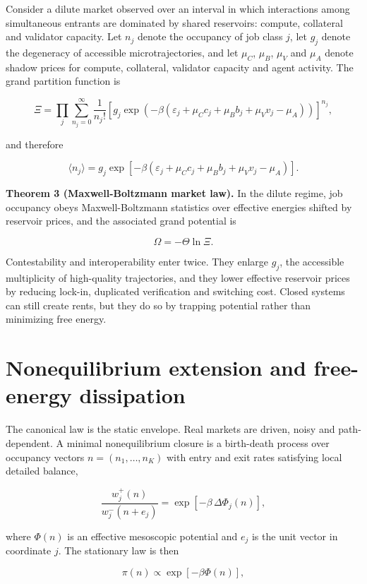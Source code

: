 Consider a dilute market observed over an interval in which interactions
among simultaneous entrants are dominated by shared reservoirs: compute,
collateral and validator capacity. Let \(n_j\) denote the occupancy of
job class \(j\), let \(g_j\) denote the degeneracy of accessible
microtrajectories, and let \(\mu_C\), \(\mu_B\), \(\mu_V\) and \(\mu_A\)
denote shadow prices for compute, collateral, validator capacity and
agent activity. The grand partition function is

\[
\Xi = \prod_j \sum_{n_j=0}^{\infty} \frac{1}{n_j!}
\left[g_j\exp\!\left(-\beta\left(\varepsilon_j + \mu_C c_j + \mu_B b_j + \mu_V v_j - \mu_A\right)\right)\right]^{n_j},
\]

and therefore

\[
\langle n_j \rangle = g_j\exp\!\left[-\beta\left(\varepsilon_j + \mu_C c_j + \mu_B b_j + \mu_V v_j - \mu_A\right)\right].
\]

\textbf{Theorem 3 (Maxwell-Boltzmann market law).} In the dilute regime,
job occupancy obeys Maxwell-Boltzmann statistics over effective energies
shifted by reservoir prices, and the associated grand potential is

\[
\Omega = -\Theta \ln \Xi.
\]

Contestability and interoperability enter twice. They enlarge \(g_j\),
the accessible multiplicity of high-quality trajectories, and they lower
effective reservoir prices by reducing lock-in, duplicated verification
and switching cost. Closed systems can still create rents, but they do
so by trapping potential rather than minimizing free energy.

\section{Nonequilibrium extension and free-energy
dissipation}\label{nonequilibrium-extension-and-free-energy-dissipation}

The canonical law is the static envelope. Real markets are driven, noisy
and path-dependent. A minimal nonequilibrium closure is a birth-death
process over occupancy vectors \(n=(n_1,\dots,n_K)\) with entry and exit
rates satisfying local detailed balance,

\[
\frac{w_j^+(n)}{w_j^-(n+e_j)}
= \exp\!\left[-\beta\,\Delta \Phi_j(n)\right],
\]

where \(\Phi(n)\) is an effective mesoscopic potential and \(e_j\) is
the unit vector in coordinate \(j\). The stationary law is then

\[
\pi(n) \propto \exp\!\left[-\beta\Phi(n)\right],
\]

